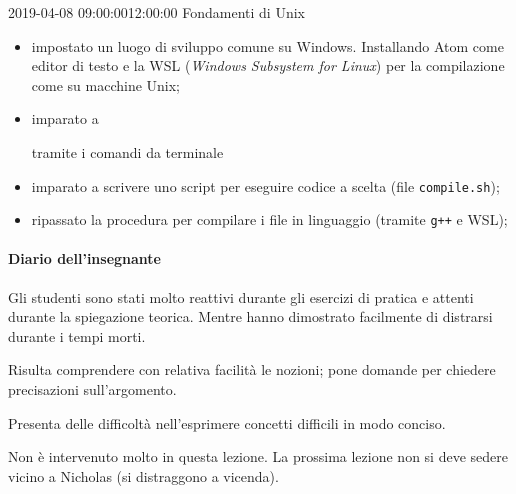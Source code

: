 \documentclass{tufte-book}
\begin{document}
\begin{lezione}
	{2019-04-08}
	{09:00:00}{12:00:00}
	{Fondamenti di Unix}

\begin{itemize}
	\item impostato un luogo di sviluppo comune su Windows. Installando Atom come editor di testo e la WSL (\emph{Windows Subsystem for Linux}) per la compilazione come su macchine Unix;
	\item imparato a
	 tramite i comandi da terminale
	\item imparato a scrivere uno script per eseguire codice a scelta (file \texttt{compile.sh});
	\item ripassato la procedura per compilare i file in linguaggio {\Cpp} (tramite \texttt{g++} e WSL);
\end{itemize}

\paragraph{Diario dell'insegnante}
Gli studenti sono stati molto reattivi durante gli esercizi di pratica e attenti durante la spiegazione teorica.
Mentre hanno dimostrato facilmente di distrarsi durante i tempi morti.

Risulta comprendere con relativa facilità le nozioni; pone domande per chiedere precisazioni sull'argomento.

Presenta delle difficoltà nell'esprimere concetti difficili in modo conciso.

Non è intervenuto molto in questa lezione.
La prossima lezione non si deve sedere vicino a Nicholas (si distraggono a vicenda).

\end{lezione}
\end{document}
